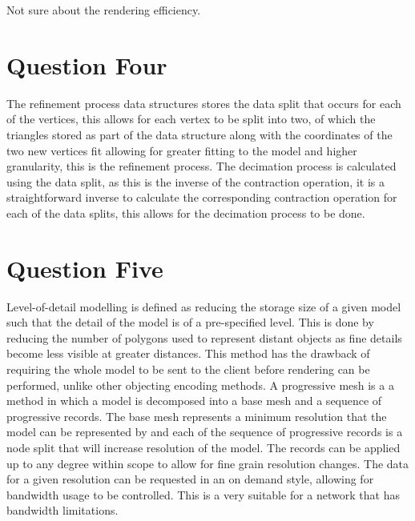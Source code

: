 \documentclass[paper=a4, fontsize=11pt]{scrartcl}
\numberwithin{equation}{section}		%
\numberwithin{figure}{section}			%
\numberwithin{table}{section}				%
\begin{document}
Not sure about the rendering efficiency.

\section*{Question Four}

\iffalse
10 marks \\
100 words \\
Explain how progressive meshes implement the refinement and decimation processes. \\
\fi

The refinement process data structures stores the data split that occurs for each of the vertices, this allows for each vertex to be split into two, of which the triangles stored as part of the data structure along with the coordinates of the two new vertices fit allowing for greater fitting to the model and higher granularity, this is the refinement process. The decimation process is calculated using the data split, as this is the inverse of the contraction operation, it is a straightforward inverse to calculate the corresponding contraction operation for each of the data splits, this allows for the decimation process to be done.

\section*{Question Five}

\iffalse
20 marks \\
200 words \\
Analyse how the incorporation of level-of-detail modeling impacts the rendering performance
and network bandwidth consumption of a large distributed virtual environment system.
Evaluate the suitability of using progressive meshes to implement the level-of-detail modeling
in such a system. \\
Note that in the above distributed virtual environment system, all graphics models of the virtual
environment are maintained by a remote server. During runtime, each client will download
relevant graphics models on-demand from the server to support interaction and visualisation. \\
\fi

Level-of-detail modelling is defined as reducing the storage size of a given model such that the detail of the model is of a pre-specified level. This is done by reducing the number of polygons used to represent distant objects as fine details become less visible at greater distances. This method has the drawback of requiring the whole model to be sent to the client before rendering can be performed, unlike other objecting encoding methods. A progressive mesh is a a method in which a model is decomposed into a base mesh and a sequence of progressive records. The base mesh represents a minimum resolution that the model can be represented by and each of the sequence of progressive records is a node split that will increase resolution of the model. The records can be applied up to any degree within scope to allow for fine grain resolution changes. The data for a given resolution can be requested in an on demand style, allowing for bandwidth usage to be controlled. This is a very suitable for a network that has bandwidth limitations.
\end{document}
